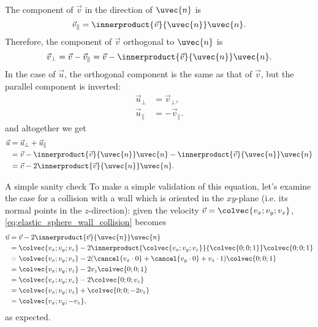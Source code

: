 The component of $\vec{v}$ in the direction of $\uvec{n}$ is
\begin{equation}
	\vec{v}_{\parallel} = \innerproduct{\vec{v}}{\uvec{n}}\uvec{n}.
\end{equation}
Therefore, the component of $\vec{v}$ orthogonal to $\uvec{n}$ is
\begin{equation}
	\vec{v}_{\perp} = \vec{v} - \vec{v}_{\parallel} = \vec{v} - \innerproduct{\vec{v}}{\uvec{n}}\uvec{n}.
\end{equation}
In the case of $\vec{u}$, the orthogonal component is the same as that of $\vec{v}$, but the parallel component is inverted:
\begin{equation}
	\begin{aligned}
		\vec{u}_{\perp}     & = \vec{v}_{\perp},      \\
		\vec{u}_{\parallel} & = -\vec{v}_{\parallel}.
	\end{aligned}
\end{equation}
and altogether we get
\begin{equation}
	\begin{aligned}
		\vec{u} & = \vec{u}_{\perp} + \vec{u}_{\parallel}                                                         \\
		        & = \vec{v} - \innerproduct{\vec{v}}{\uvec{n}}\uvec{n} - \innerproduct{\vec{v}}{\uvec{n}}\uvec{n} \\
		        & = \vec{v}-2\innerproduct{\vec{v}}{\uvec{n}}\uvec{n}.
	\end{aligned}
	\label{eq:elastic_sphere_wall_collision}
\end{equation}

\begin{example}{A simple sanity check}{}
	To make a simple validation of this equation, let's examine the case for a collision with a wall which is oriented in the $xy$-plane (i.e. its normal points in the $z$-direction): given the velocity $\vec{v}=\colvec{v_{x};v_{y};v_{z}}$, \autoref{eq:elastic_sphere_wall_collision} becomes
	\begin{align*}
		\vec{u} & = \vec{v}-2\innerproduct{\vec{v}}{\uvec{n}}\uvec{n}                                                   \\
		        & = \colvec{v_{x};v_{y};v_{z}}-2\innerproduct{\colvec{v_{x};v_{y};v_{z}}}{\colvec{0;0;1}}\colvec{0;0;1} \\
		        & = \colvec{v_{x};v_{y};v_{z}}-2(\cancel{v_{x}\cdot0}+\cancel{v_{y}\cdot0}+v_{z}\cdot1)\colvec{0;0;1}   \\
		        & = \colvec{v_{x};v_{y};v_{z}}-2v_{z}\colvec{0;0;1}                                                     \\
		        & = \colvec{v_{x};v_{y};v_{z}}-2\colvec{0;0;v_{z}}                                                      \\
		        & =  \colvec{v_{x};v_{y};v_{z}}+\colvec{0;0;-2v_{z}}                                                    \\
		        & =  \colvec{v_{x};v_{y};-v_{z}},
	\end{align*}
	as expected.
\end{example}


